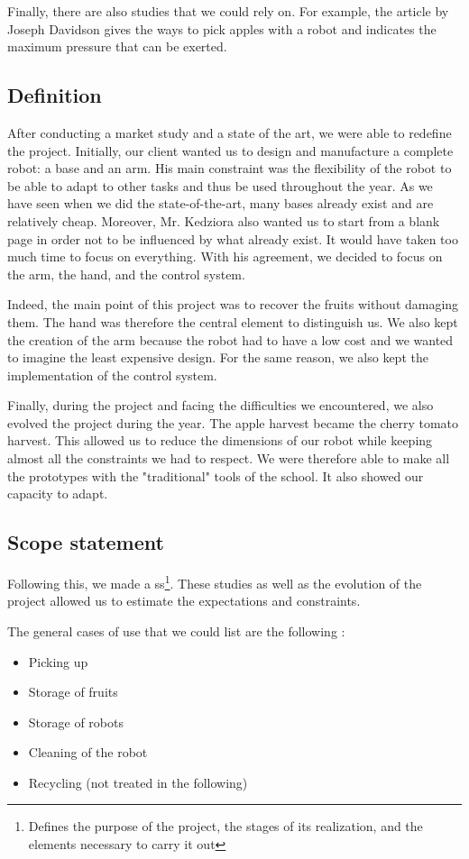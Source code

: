 \bigbreak
Finally, there are also studies that we could rely on. For example, the article by Joseph Davidson \cite{Davidson-2016-126540} gives the ways to pick apples with a robot and indicates the maximum pressure that can be exerted.

\subsection{Definition}
\label{Def1}
After conducting a market study and a state of the art, we were able to redefine the project. Initially, our client wanted us to design and manufacture a complete robot: a base and an arm. His main constraint was the flexibility of the robot to be able to adapt to other tasks and thus be used throughout the year. As we have seen when we did the state-of-the-art, many bases already exist and are relatively cheap. Moreover, Mr. Kedziora also wanted us to start from a blank page in order not to be influenced by what already exist. It would have taken too much time to focus on everything. With his agreement, we decided to focus on the arm, the hand, and the control system. 

\bigbreak
Indeed, the main point of this project was to recover the fruits without damaging them. The hand was therefore the central element to distinguish us. We also kept the creation of the arm because the robot had to have a low cost and we wanted to imagine the least expensive design. For the same reason, we also kept the implementation of the control system. 

\bigbreak
Finally, during the project and facing the difficulties we encountered, we also evolved the project during the year. The apple harvest became the cherry tomato harvest. This allowed us to reduce the dimensions of our robot while keeping almost all the constraints we had to respect. We were therefore able to make all the prototypes with the "traditional" tools of the school. It also showed our capacity to adapt.
\subsection{Scope statement}
\label{ScoSta}
Following this, we made a \gls{ss}\footnote{Defines the purpose of the project, the stages of its realization, and the elements necessary to carry it out}. These studies as well as the evolution of the project allowed us to estimate the expectations and constraints. 

\bigbreak
\noindent The general cases of use that we could list are the following : 
\begin{itemize}[noitemsep]
    \item Picking up
    \item Storage of fruits
    \item Storage of robots
    \item Cleaning of the robot
    \item Recycling (not treated in the following)
\end{itemize}

